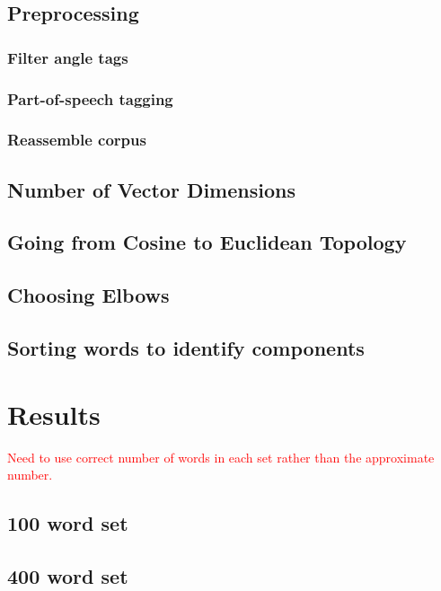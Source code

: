 \documentclass[10pt,letterpaper]{article}
\newcommand{\todo}[1]{\textcolor{red}{#1}}
\begin{document}
\subsection{Preprocessing}

\subsubsection{Filter angle tags}

\subsubsection{Part-of-speech tagging}

\subsubsection{Reassemble corpus}

\subsection{Number of Vector Dimensions}

\subsection{Going from Cosine to Euclidean Topology}

\subsection{Choosing Elbows}

\subsection{Sorting words to identify components}

\section{Results}

\todo{Need to use correct number of words in each set rather than the approximate number.}

\subsection{100 word set}

\subsection{400 word set}
\end{document}
